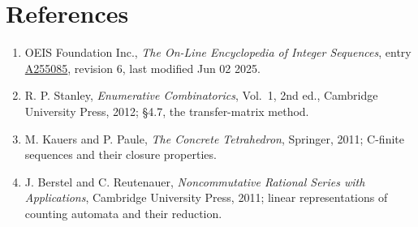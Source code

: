 \documentclass[11pt]{article}
\theoremstyle{definition}
\begin{document}
\section{References}

\begin{enumerate}

\item OEIS Foundation Inc., \emph{The On-Line Encyclopedia of Integer Sequences}, entry \href{https://oeis.org/A255085}{A255085}, revision 6, last modified Jun 02 2025.

\item R. P. Stanley, \emph{Enumerative Combinatorics}, Vol.~1, 2nd ed., Cambridge University Press, 2012; \S4.7, the transfer-matrix method.

\item M. Kauers and P. Paule, \emph{The Concrete Tetrahedron}, Springer, 2011; C-finite sequences and their closure properties.

\item J. Berstel and C. Reutenauer, \emph{Noncommutative Rational Series with Applications}, Cambridge University Press, 2011; linear representations of counting automata and their reduction.

\end{enumerate}
\end{document}
